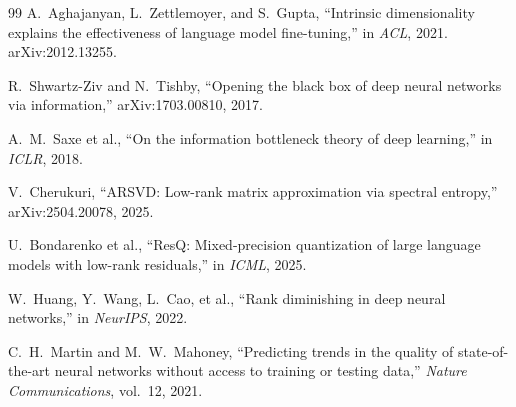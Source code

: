 \documentclass[11pt]{article}
\begin{document}
\begin{thebibliography}{99}
A.~Aghajanyan, L.~Zettlemoyer, and S.~Gupta, ``Intrinsic dimensionality explains the effectiveness of language model fine-tuning,'' in \emph{ACL}, 2021. arXiv:2012.13255.

R.~Shwartz-Ziv and N.~Tishby, ``Opening the black box of deep neural networks via information,'' arXiv:1703.00810, 2017.

A.~M.~Saxe et al., ``On the information bottleneck theory of deep learning,'' in \emph{ICLR}, 2018.

V.~Cherukuri, ``ARSVD: Low-rank matrix approximation via spectral entropy,'' arXiv:2504.20078, 2025.

U.~Bondarenko et al., ``ResQ: Mixed-precision quantization of large language models with low-rank residuals,'' in \emph{ICML}, 2025.

W.~Huang, Y.~Wang, L.~Cao, et al., ``Rank diminishing in deep neural networks,'' in \emph{NeurIPS}, 2022.

C.~H.~Martin and M.~W.~Mahoney, ``Predicting trends in the quality of state-of-the-art neural networks without access to training or testing data,'' \emph{Nature Communications}, vol.~12, 2021.

\end{thebibliography}
\end{document}
